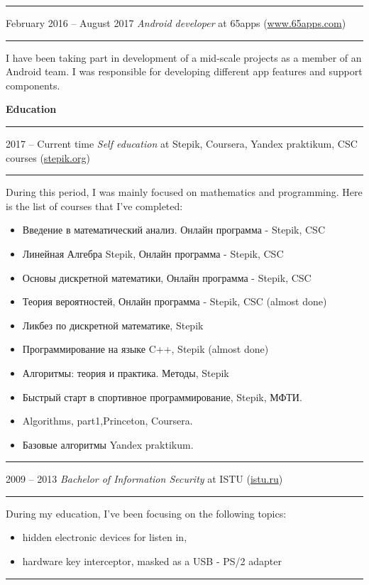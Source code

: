 \documentclass[11pt]{article}
\newcommand\CvSmallSkipLength{0.5em}
\newcommand\CvBigSkipLength{1em}
\newcommand\CvSkip[1]{\vspace{#1}}
\newcommand\CvSmallSkip{\CvSkip{\CvSmallSkipLength}}
\newcommand\CvBigSkip{\CvSkip{\CvBigSkipLength}}
\newcommand\CvSectionHeader[1]{\CvBigSkip\textbf{#1}\CvBigSkip}
\newcommand\CvRule{\begingroup\color{CvRuleColor}\hrule\endgroup}
\newcommand\CvWorkplaceHeader[5]{\begingroup%
	\CvRule%
	\fboxsep0pt%
	\colorbox{CvWorkplaceHeaderColor}{%
		\begin{minipage}{\linewidth-2\fboxsep}%
			\CvSmallSkip%
			#1 -- #2 \hfill \textit{#3} at #4 (\href{http://#5/}{#5})%
			\CvSmallSkip%
		\end{minipage}%
	}%
	\CvRule%
	\endgroup%
}
\newenvironment{CvWorkplaceDescription}{%
	\begingroup\setlength\parskip{\CvSmallSkipLength}%
}{%
	\CvSmallSkip\endgroup%
}
\begin{document}
	\CvWorkplaceHeader{February 2016}{August 2017}{Android developer}{65apps}{www.65apps.com}
	
	\begin{CvWorkplaceDescription}
		I have been taking part in development of a mid-scale projects as a member of an Android team. I was responsible for developing different app features and support components.
	\end{CvWorkplaceDescription}
	
	\begin{LARGE}  
		\CvSectionHeader{Education}
	\end{LARGE} 
	
	
	\CvWorkplaceHeader{2017}{Current time}{Self education}{Stepik, Coursera, Yandex praktikum, CSC courses}{stepik.org}
	
	\begin{CvWorkplaceDescription}
		During this period, I was mainly focused on mathematics and programming.
		Here is the list of courses that I've completed:
		\begin{itemize}[noitemsep]
			\item Введение в математический анализ. Онлайн программа - Stepik, CSC
			\item Линейная Алгебра Stepik, Онлайн программа - Stepik, CSC
			\item Основы дискретной математики, Онлайн программа - Stepik, CSC
			\item Теория вероятностей, Онлайн программа - Stepik, CSC (almost done)
			\item Ликбез по дискретной математике, Stepik
			\item Программирование на языке C++, Stepik (almost done)
			\item Алгоритмы: теория и практика. Методы, Stepik
			\item Быстрый старт в спортивное программирование, Stepik, МФТИ.
			\item Algorithms, part1,Princeton, Coursera. 
			\item Базовые алгоритмы Yandex praktikum.
		\end{itemize}
	\end{CvWorkplaceDescription}
	
	\CvWorkplaceHeader{2009}{2013}{Bachelor of Information Security}{ISTU}{istu.ru}
	
	\begin{CvWorkplaceDescription}
		During my education, I've been focusing on the following topics:
		\begin{itemize}[noitemsep]
			\item hidden electronic devices for listen in,
			\item hardware key interceptor, masked as a USB - PS/2 adapter
		\end{itemize}
	\end{CvWorkplaceDescription}
	\CvRule
	
\end{document}
